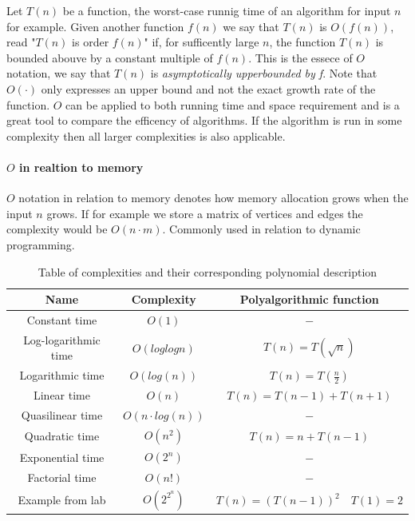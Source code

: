 \documentclass[12pt]{article} %
\begin{document}
Let $T(n)$ be a function, the worst-case runnig time of an algorithm for input $n$ for example. Given another function $f(n)$ we say that $T(n)$ is $O(f(n))$, read "$T(n)$ is order $f(n)$" if, for sufficently large $n$, the function $T(n)$ is bounded abouve by a constant multiple of $f(n)$. This is the essece of $O$ notation, we say that $T(n)$ is \textit{asymptotically upperbounded by f}. Note that $O(\cdot)$ only expresses an upper bound and not the exact growth rate of the function.
$O$ can be applied to both running time and space requirement and is a great tool to compare the efficency of algorithms. If the algorithm is run in some complexity then all larger complexities is also applicable.

\paragraph{$O$ in realtion to memory}
$O$ notation in relation to memory denotes how memory allocation grows when the input $n$ grows. If for example we store a matrix of vertices and edges the complexity would be $O(n \cdot m)$. Commonly used in relation to dynamic programming.

\begin{table}[H]
\centering
\begin{tabular}{| c | c | c |}
    \hline
    Name & Complexity & Polyalgorithmic function \\
    \hline \hline
    Constant time & $O(1)$ & $-$ \\
    Log-logarithmic time & $O(log log n)$ & $T(n) = T(\sqrt{n})$\\
    Logarithmic time & $O(log(n))$ & $T(n) = T(\frac{n}{2})$ \\
    Linear time & $O(n)$ & $T(n) = T(n - 1) + T(n + 1)$ \\
    Quasilinear time & $O(n \cdot log(n))$ & $-$ \\
    Quadratic time & $O(n^2)$ & $T(n) = n + T(n -1)$ \\
    Exponential time & $O(2^n)$ & $-$ \\
    Factorial time & $O(n!)$ & $-$\\
    Example from lab & $O(2^{2^{n}})$ & $T(n) = (T(n-1))^2 \quad T(1) = 2$ \\
    \hline
\end{tabular}
\caption{Table of complexities and their corresponding polynomial description}
\label{table: 2}
\end{table}
\end{document}

